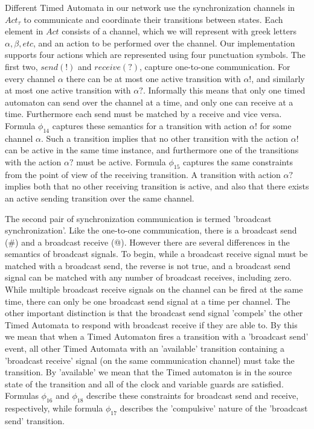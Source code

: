\documentclass[a4paper,12pt]{article}
\begin{document}
Different Timed Automata in our network use the synchronization channels in
\(Act_\tau\) to communicate and coordinate their transitions between states.
Each element in \(Act\) consists of a channel, which we will represent with
greek letters \(\alpha, \beta, etc\), and an action to be performed over the
channel. Our implementation supports four actions which are represented using
four punctuation symbols. The first two, \(send(!)\) and \(receive(?)\), capture
one-to-one communication. For every channel \(\alpha\) there can be at most one
active transition with \(\alpha!\), and similarly at most one active transition
with \(\alpha?\). Informally this means that only one timed automaton can send
over the channel at a time, and only one can receive at a time. Furthermore each
send must be matched by a receive and vice versa. Formula \(\phi_{14}\) captures
these semantics for a transition with action \(\alpha!\) for some channel
\(\alpha\). Such a transition implies that no other transition with the action
\(\alpha!\) can be active in the same time instance, and furthermore one of the
transitions with the action \(\alpha?\) must be active. Formula \(\phi_{15}\)
captures the same constraints from the point of view of the receiving
transition. A transition with action \(\alpha?\) implies both that no other
receiving transition is active, and also that there exists an active sending
transition over the same channel.

The second pair of synchronization communication is termed 'broadcast
synchronization'. Like the one-to-one communication, there is a broadcast send
(\#) and a broadcast receive (@). However there are several differences in the
semantics of broadcast signals. To begin, while a broadcast receive signal must
be matched with a broadcast send, the reverse is not true, and a broadcast send
signal can be matched with any number of broadcast receives, including zero.
While multiple broadcast receive signals on the channel can be fired at the same
time, there can only be one broadcast send signal at a time per channel. The
other important distinction is that the broadcast send signal 'compels' the
other Timed Automata to respond with broadcast receive if they are able to. By
this we mean that when a Timed Automaton fires a transition with a 'broadcast
send' event, all other Timed Automata with an 'available' transition containing
a 'broadcast receive' signal (on the same communication channel) must take the
transition. By 'available' we mean that the Timed automaton is in the source
state of the transition and all of the clock and variable guards are satisfied.
Formulas \(\phi_{16}\) and \(\phi_{18}\) describe these constraints for
broadcast send and receive, respectively, while formula \(\phi_{17}\) describes
the 'compulsive' nature of the 'broadcast send' transition.
\end{document}
